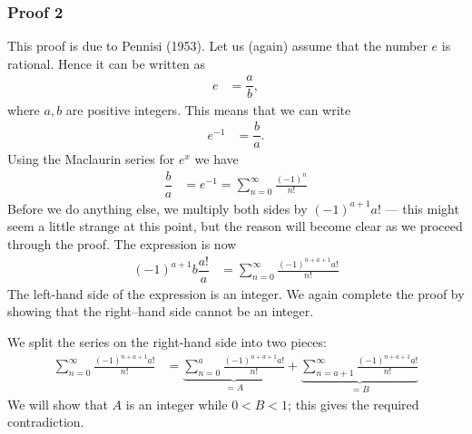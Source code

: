\subsubsection*{Proof 2}
This proof is due to Pennisi (1953). Let us (again) assume that
the number $e$ is rational. Hence it can be written as
\begin{align*}
  e &= \dfrac{a}{b},
\end{align*}
where $a,b$ are positive integers. This means that we can write
\begin{align*}
  e^{-1} &= \dfrac{b}{a}.
\end{align*}
Using the Maclaurin series for $e^x$ we have
\begin{align*}
  \dfrac{b}{a} &= e^{-1} = \sum_{n=0}^\infty \frac{(-1)^n}{n!}
\end{align*}
Before we do anything else, we multiply both sides by $(-1)^{a+1} a!$ ---
this might seem a little strange at this point, but the reason will
become clear as we proceed through the proof. The expression is now
\begin{align*}
  (-1)^{a+1} b \dfrac{a!}{a} &=
  \sum_{n=0}^\infty \frac{(-1)^{n+a+1} a!}{n!}
\end{align*}
The left-hand side of the expression is an integer. We again complete
the proof by showing that the right--hand side cannot be an integer.

We split the series on the right-hand side into two pieces:
\begin{align*}
  \sum_{n=0}^\infty \frac{(-1)^{n+a+1} a!}{n!}
  &=
  \underbrace{\sum_{n=0}^a \frac{(-1)^{n+a+1} a!}{n!}}_{=A}
  + \underbrace{\sum_{n=a+1}^\infty \frac{(-1)^{n+a+1} a!}{n!}}_{=B}
\end{align*}
We will show that $A$ is an integer while $0<B<1$; this gives the required contradiction.

